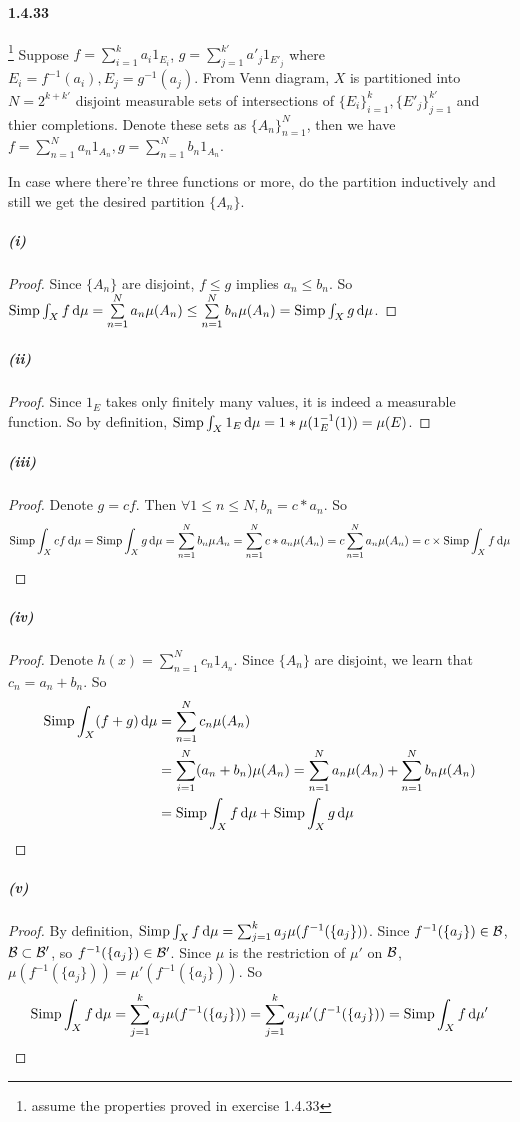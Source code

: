 \documentclass{article}
\begin{document}
\newcommand{\sit}{\sip\int_{X}}

\paragraph{1.4.33}\footnote{assume the properties proved in exercise 1.4.33}
Suppose $f=\sum\limits_{i=1}^{k}a_i1_{E_i}$, $g=\sum\limits_{j=1}^{k'}a'_j1_{E'_j}$ where $E_i=f^{-1}(a_i), E_j=g^{-1}(a_j)$. From Venn diagram, $X$ is partitioned into $N=2^{k+k'}$ disjoint measurable sets of intersections of $\{E_i\}_{i=1}^{k},\{E'_j\}_{j=1}^{k'}$ and thier completions. Denote these sets as $\{A_n\}_{n=1}^{N}$, then we have  $f=\sum\limits_{n=1}^{N}a_n1_{A_n},g=\sum\limits_{n=1}^{N}b_n1_{A_n}$. 

In case where there're three functions or more, do the partition inductively and still we get the desired partition $\{A_n\}$.
\subparagraph{(i)}
\begin{proof}
Since $\{A_n\}$ are disjoint, $f\leq g$ implies $a_n\leq b_n$. So $\mathrm{Simp}\int_{X} f \,\mathrm{d} \mu=\sum\limits_{n=1}^{N}a_n\mu(A_n)\leq \sum\limits_{n=1}^{N}b_n\mu(A_n)=\mathrm{Simp}\int_{X} g\,\mathrm{d} \mu$.
\end{proof}
\subparagraph{(ii)}
\begin{proof}
Since $1_E$ takes only finitely many values, it is indeed a measurable function. So by definition, $\sit 1_{E}\du=1*\mu(1_E^{-1}(1))=\mu(E)$.
\end{proof}
\subparagraph{(iii)}
\begin{proof}
Denote $g=cf$. Then $\forall 1\leq n\leq N, b_n=c*a_n$. So 
\[\sit cf \du=\sit g \du=\sum_{n=1}^{N}b_n\mu{A_n}=\sum_{n=1}^{N}c*a_n\mu(A_n)=c\sum_{n=1}^{N}a_n\mu(A_n)=c\times \sit f \du\]
\end{proof}
\subparagraph{(iv)}
\begin{proof}
Denote $h(x)=\sum\limits_{n=1}^{N}c_n1_{A_n}$. Since $\{A_n\}$ are disjoint, we learn that $c_n=a_n+b_n$. So 
\[\begin{aligned}
\sit (f+g)\du&=\sum_{n=1}^{N}c_n\mu(A_n)\\
&=\sum_{i=1}^{N}(a_n+b_n)\mu(A_n)=\sum_{n=1}^{N}a_n\mu(A_n)+\sum_{n=1}^{N}b_n\mu(A_n)\\
&=\sit f\du+\sit g\du
\end{aligned}\]
\end{proof}
\subparagraph{(v)}
\begin{proof}
By definition, $\sit f\du=\sum_{j=1}^k a_j\mu(f^{-1}(\{a_j\}))$. Since $f^{-1}(\{a_j\})\in\mathcal{B}$, $\mathcal{B}\subset \mathcal{B}'$, so $f^{-1}(\{a_j\})\in\mathcal{B}'$. Since $\mu$ is the restriction of $\mu'$ on $\mathcal{B}$, $\mu(f^{-1}(\{a_j\}))=\mu'(f^{-1}(\{a_j\}))$. So
\[\sit f\du=\sum_{j=1}^k a_j\mu(f^{-1}(\{a_j\}))=\sum_{j=1}^k a_j\mu'(f^{-1}(\{a_j\}))=\sit f\du'\]
\end{proof}
\end{document}
